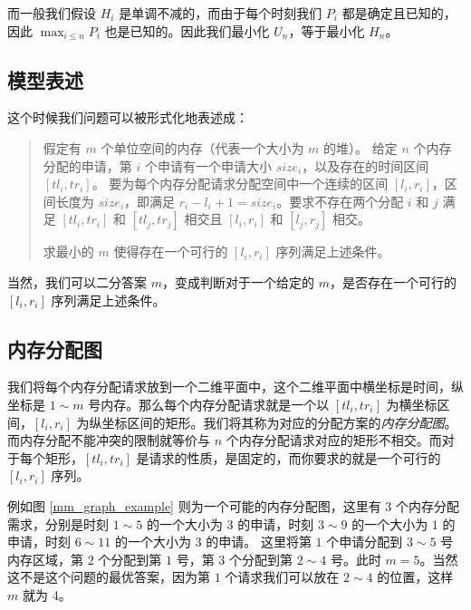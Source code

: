 \documentclass{noiassignment}
\begin{document}
	而一般我们假设 $H_i$ 是单调不减的，而由于每个时刻我们 $P_i$ 都是确定且已知的，因此 $\displaystyle \max_{i \le n} P_i$ 也是已知的。因此我们最小化 $U_n$，等于最小化 $H_n$。

	\subsection{模型表述}
	
	这个时候我们问题可以被形式化地表述成：
	
	\begin{quotation}
		假定有 $m$ 个单位空间的内存（代表一个大小为 $m$ 的堆）。
		给定 $n$ 个内存分配的申请，第 $i$ 个申请有一个申请大小 $size_i$，以及存在的时间区间 $[tl_i, tr_i]$。
		要为每个内存分配请求分配空间中一个连续的区间 $[l_i, r_i]$，区间长度为 $size_i$，即满足 $r_i - l_i + 1 = size_i$。要求不存在两个分配 $i$ 和 $j$ 满足 $[tl_i, tr_i]$ 和 $[tl_j, tr_j]$ 相交且 $[l_i, r_i]$ 和 $[l_j, r_j]$ 相交。

		求最小的 $m$ 使得存在一个可行的 $[l_i, r_i]$ 序列满足上述条件。
	\end{quotation}

	当然，我们可以二分答案 $m$，变成判断对于一个给定的 $m$，是否存在一个可行的 $[l_i, r_i]$ 序列满足上述条件。

	\subsection{内存分配图}

	我们将每个内存分配请求放到一个二维平面中，这个二维平面中横坐标是时间，纵坐标是 $1 \sim m$ 号内存。那么每个内存分配请求就是一个以 $[tl_i, tr_i]$ 为横坐标区间，$[l_i, r_i]$ 为纵坐标区间的矩形。我们将其称为对应的分配方案的\emph{内存分配图}。
	而内存分配不能冲突的限制就等价与 $n$ 个内存分配请求对应的矩形不相交。而对于每个矩形，$[tl_i, tr_i]$ 是请求的性质，是固定的，而你要求的就是一个可行的 $[l_i, r_i]$ 序列。
	
	例如图 \ref{mm_graph_example} 则为一个可能的内存分配图，这里有 $3$ 个内存分配需求，分别是时刻 $1 \sim 5$ 的一个大小为 $3$ 的申请，时刻 $3 \sim 9$ 的一个大小为 $1$ 的申请，时刻 $6 \sim 11$ 的一个大小为 $3$ 的申请。
	这里将第 $1$ 个申请分配到 $3 \sim 5$ 号内存区域，第 $2$ 个分配到第 $1$ 号，第 $3$ 个分配到第 $2 \sim 4$ 号。此时 $m=5$。当然这不是这个问题的最优答案，因为第 $1$ 个请求我们可以放在 $2 \sim 4$ 的位置，这样 $m$ 就为 $4$。
\end{document}

